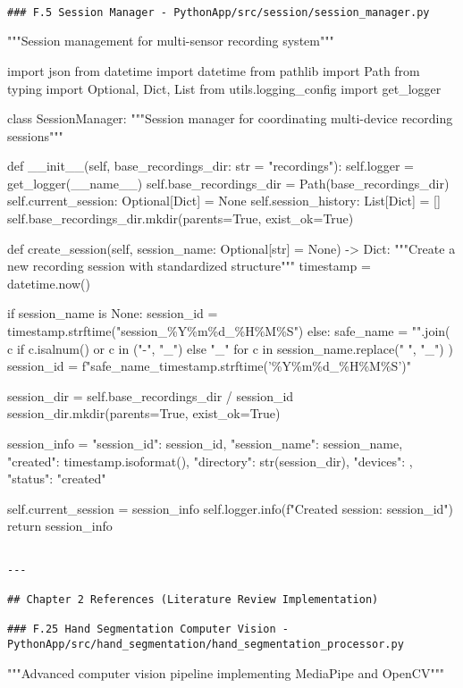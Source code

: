 \documentclass[12pt,a4paper]{report}
\begin{document}
\begin{verbatim}

### F.5 Session Manager - PythonApp/src/session/session_manager.py

\end{verbatim}
"""Session management for multi-sensor recording system"""

import json
from datetime import datetime
from pathlib import Path
from typing import Optional, Dict, List
from utils.logging\_config import get\_logger


class SessionManager:
    """Session manager for coordinating multi-device recording sessions"""

    def \_\_init\_\_(self, base\_recordings\_dir: str = "recordings"):
        self.logger = get\_logger(\_\_name\_\_)
        self.base\_recordings\_dir = Path(base\_recordings\_dir)
        self.current\_session: Optional[Dict] = None
        self.session\_history: List[Dict] = []
        self.base\_recordings\_dir.mkdir(parents=True, exist\_ok=True)

    def create\_session(self, session\_name: Optional[str] = None) -> Dict:
        """Create a new recording session with standardized structure"""
        timestamp = datetime.now()

        if session\_name is None:
            session\_id = timestamp.strftime("session\_\%Y\%m\%d\_\%H\%M\%S")
        else:
            safe\_name = "".join(
                c if c.isalnum() or c in ("-", "\_") else "\_"
                for c in session\_name.replace(" ", "\_")
            )
            session\_id = f"{safe\_name}\_{timestamp.strftime('\%Y\%m\%d\_\%H\%M\%S')}"

        session\_dir = self.base\_recordings\_dir / session\_id
        session\_dir.mkdir(parents=True, exist\_ok=True)

        session\_info = {
            "session\_id": session\_id,
            "session\_name": session\_name,
            "created": timestamp.isoformat(),
            "directory": str(session\_dir),
            "devices": {},
            "status": "created"
        }

        self.current\_session = session\_info
        self.logger.info(f"Created session: {session\_id}")
        return session\_info
\begin{verbatim}

---

## Chapter 2 References (Literature Review Implementation)

### F.25 Hand Segmentation Computer Vision - PythonApp/src/hand_segmentation/hand_segmentation_processor.py

\end{verbatim}
"""Advanced computer vision pipeline implementing MediaPipe and OpenCV"""
\end{document}
